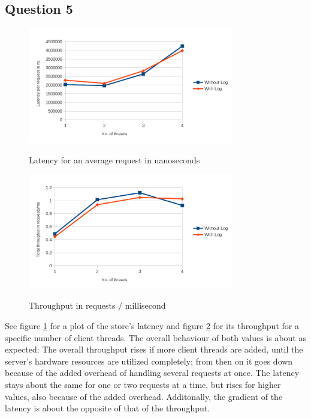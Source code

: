 \documentclass[12pt,a4paper]{article}
\begin{document}
\subsection*{Question 5}
\label{sec:pq5}
\begin{figure}
\centering
  \includegraphics[width=0.8\textwidth]{latency}\\
  \caption{Latency for an average request in nanoseconds}
  \label{fig:latency}
\end{figure}

\begin{figure}
\centering
  \includegraphics[width=0.8\textwidth]{throughput}\\
  \caption{Throughput in requests / millisecond}
  \label{fig:throughput}
\end{figure}

See figure \ref{fig:latency} for a plot of the store's latency and figure \ref{fig:throughput} for its throughput for a specific number of client threads. The overall behaviour of both values is about as expected: The overall throughput rises if more client threads are added, until the server's hardware resources are utilized completely; from then on it goes down because of the added overhead of handling several requests at once. The latency stays about the same for one or two requests at a time, but rises for higher values, also because of the added overhead. Additonally, the gradient of the latency is about the opposite of that of the throughput.
\end{document}
